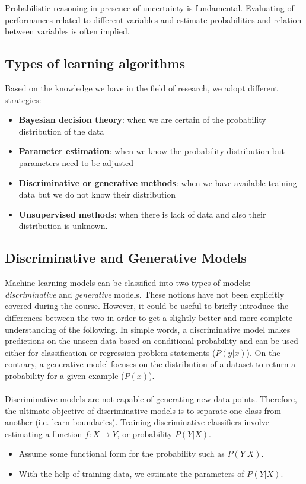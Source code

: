 Probabilistic reasoning in presence of uncertainty is fundamental. Evaluating of
performances related to different variables and estimate probabilities and
relation between variables is often implied.

\subsection{Types of learning algorithms}
Based on the knowledge we have in the field of research, we adopt different strategies:
\begin{itemize}
	\item \textbf{Bayesian decision theory}: when we are certain of the probability
		distribution of the data

	\item \textbf{Parameter estimation}: when we know the probability distribution
		but parameters need to be adjusted

	\item \textbf{Discriminative or generative methods}: when we have available training
		data but we do not know their distribution

	\item \textbf{Unsupervised methods}: when there is lack of data and also their
		distribution is unknown.
\end{itemize}

\subsection{Discriminative and Generative Models}
Machine learning models can be classified into two types of models: \textit{discriminative}
and \textit{generative} models. These notions have not been explicitly covered during
the course. However, it could be useful to briefly introduce the differences between
the two in order to get a slightly better and more complete understanding of the
following. In simple words, a discriminative model makes predictions on the unseen
data based on conditional probability and can be used either for classification or
regression problem statements ($P(y | x)$). On the contrary, a generative model focuses
on the distribution of a dataset to return a probability for a given example ($P(
x)$).

\paragraph{}

Discriminative models are not capable of generating new data points. Therefore, the
ultimate objective of discriminative models is to separate one class from another
(i.e. learn boundaries). Training discriminative classifiers involve estimating a
function $f: X \rightarrow Y$, or probability $P(Y|X)$.
\begin{itemize}
	\item Assume some functional form for the probability such as $P(Y|X)$.

	\item With the help of training data, we estimate the parameters of $P(Y|X)$.
\end{itemize}

